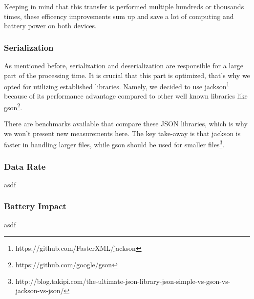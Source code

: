 Keeping in mind that this transfer is performed multiple hundreds or thousands times, these efficency improvements sum up and save a lot of computing and battery power on both devices.

\subsubsection{Serialization}
As mentioned before, serialization and deserialization are responsible for a large part of the processing time.
It is crucial that this part is optimized, that's why we opted for utilizing established libraries.
Namely, we decided to use jackson\footnote{https://github.com/FasterXML/jackson} because of its performance advantage compared to other well known libraries like gson\footnote{https://github.com/google/gson}.

There are benchmarks available that compare these JSON libraries, which is why we won't present new measurements here.
The key take-away is that jackson is faster in handling larger files, while gson should be used for smaller files\footnote{http://blog.takipi.com/the-ultimate-json-library-json-simple-vs-gson-vs-jackson-vs-json/}.

\subsubsection{Data Rate}
asdf

\subsubsection{Battery Impact}
asdf


\clearpage